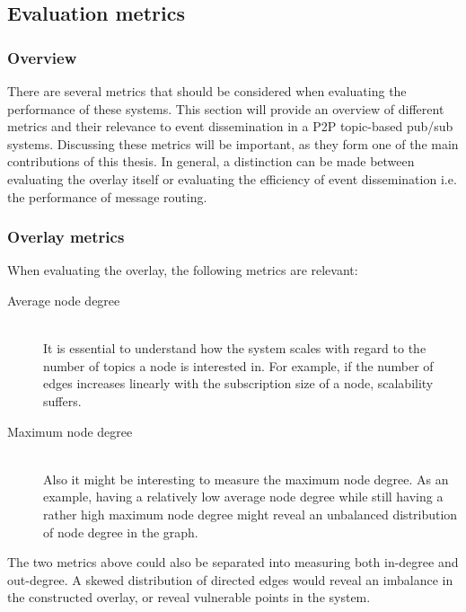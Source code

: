 \subsection{Evaluation metrics}

    \subsubsection{Overview}

     There are several metrics that should be considered when evaluating the
     performance of these systems. This section will provide an overview of
     different metrics and their relevance to event dissemination in a P2P
     topic-based pub/sub systems. Discussing these metrics will be
     important, as they form one of the main contributions of this
     thesis. In general, a distinction can be made
     between evaluating the overlay itself or evaluating the efficiency of
     event dissemination i.e. the performance of message routing. 

\subsubsection{Overlay metrics}
    When evaluating the overlay,
    the following metrics are relevant:

    \begin{description}
        
    \item[Average node degree]\hfill\\
        It is essential to understand how the system scales with regard
        to the number of topics a node is interested in. For example, if the number of
        edges increases linearly with the subscription size of a node,
        scalability suffers. 

    \item[Maximum node degree]\hfill\\
        Also it might be interesting to measure the maximum node
        degree. As an example, having a relatively low average node
        degree while still having a rather high maximum node degree
        might reveal an unbalanced distribution of node degree in the
        graph.

    \end{description}

    The two metrics above could also be separated into measuring both
    in-degree and out-degree. A skewed distribution of directed edges
    would reveal an imbalance in the constructed overlay, or reveal
    vulnerable points in the system.

